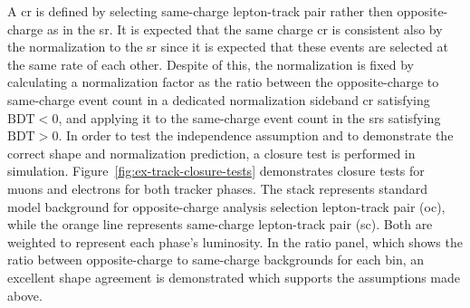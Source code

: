 A \gls{cr} is defined by selecting same-charge lepton-track pair rather then opposite-charge as in the \gls{sr}. It is expected that the same charge \gls{cr} is consistent also by the normalization to the \gls{sr} since it is expected that these events are selected at the same rate of each other. Despite of this, the normalization is fixed by calculating a normalization factor as the ratio between the opposite-charge to same-charge event count in a dedicated normalization sideband \gls{cr} satisfying $\text{BDT} < 0$, and applying it to the same-charge event count in the \glspl{sr} satisfying $\text{BDT} > 0$. In order to test the independence assumption and to demonstrate the correct shape and normalization prediction, a closure test is performed in simulation. Figure~\ref{fig:ex-track-closure-tests} demonstrates closure tests for muons and electrons for both tracker phases. The stack represents standard model background for opposite-charge analysis selection lepton-track pair (oc), while the orange line represents same-charge lepton-track pair (sc). Both are weighted to represent each phase's luminosity. In the ratio panel, which shows the ratio between opposite-charge to same-charge backgrounds for each bin, an excellent shape agreement is demonstrated which supports the assumptions made above.


